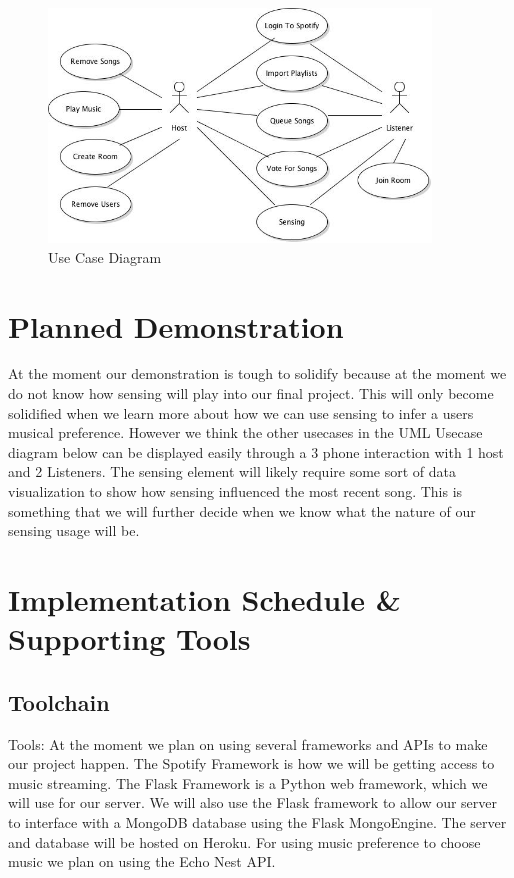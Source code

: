 \documentclass[12pt]{article}
\begin{document}
\begin{figure}[htb!]
  \centering
  \includegraphics[width=4in]{usecase-diagram}
  \caption {Use Case Diagram}
\end{figure}


\pagebreak

\section{Planned Demonstration}

At the moment our demonstration is tough to solidify because at the
moment we do not know how sensing will play into our final project.
This will only become solidified when we learn more about how we can
use sensing to infer a users musical preference. However we think the
other usecases in the UML Usecase diagram below can be displayed
easily through a 3 phone interaction with 1 host and 2 Listeners. The
sensing element will likely require some sort of data visualization to
show how sensing influenced the most recent song. This is something
that we will further decide when we know what the nature of our
sensing usage will be.

\pagebreak

\section{Implementation Schedule \& Supporting Tools}

\subsection{Toolchain}

Tools: At the moment we plan on using several frameworks and APIs to
make our project happen. The Spotify Framework is how we will be
getting access to music streaming. The Flask Framework is a Python web
framework, which we will use for our server. We will also use the
Flask framework to allow our server to interface with a MongoDB
database using the Flask MongoEngine. The server and database will be
hosted on Heroku. For using music preference to choose music we plan
on using the Echo Nest API.
\end{document}

